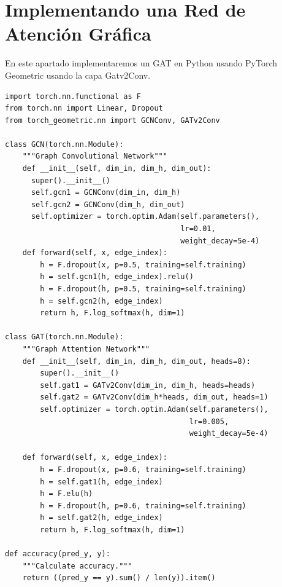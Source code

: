 \documentclass{article}
\begin{document}
\vspace{1cm}

\section{Implementando una Red de Atención Gráfica}

\vspace{1cm}

En este apartado implementaremos un GAT en Python usando PyTorch Geometric usando la capa Gatv2Conv.

\vspace{0.5cm}

\begin{lstlisting}[style=mystyle]
import torch.nn.functional as F
from torch.nn import Linear, Dropout
from torch_geometric.nn import GCNConv, GATv2Conv

class GCN(torch.nn.Module):
    """Graph Convolutional Network"""
    def __init__(self, dim_in, dim_h, dim_out):
      super().__init__()
      self.gcn1 = GCNConv(dim_in, dim_h)
      self.gcn2 = GCNConv(dim_h, dim_out)
      self.optimizer = torch.optim.Adam(self.parameters(),
                                        lr=0.01,
                                        weight_decay=5e-4)
    def forward(self, x, edge_index):
        h = F.dropout(x, p=0.5, training=self.training)
        h = self.gcn1(h, edge_index).relu()
        h = F.dropout(h, p=0.5, training=self.training)
        h = self.gcn2(h, edge_index)
        return h, F.log_softmax(h, dim=1)

class GAT(torch.nn.Module):
    """Graph Attention Network"""
    def __init__(self, dim_in, dim_h, dim_out, heads=8):
        super().__init__()
        self.gat1 = GATv2Conv(dim_in, dim_h, heads=heads)
        self.gat2 = GATv2Conv(dim_h*heads, dim_out, heads=1)
        self.optimizer = torch.optim.Adam(self.parameters(),
                                          lr=0.005,
                                          weight_decay=5e-4)

    def forward(self, x, edge_index):
        h = F.dropout(x, p=0.6, training=self.training)
        h = self.gat1(h, edge_index)
        h = F.elu(h)
        h = F.dropout(h, p=0.6, training=self.training)
        h = self.gat2(h, edge_index)
        return h, F.log_softmax(h, dim=1)

def accuracy(pred_y, y):
    """Calculate accuracy."""
    return ((pred_y == y).sum() / len(y)).item()


\end{lstlisting}
\end{document}
